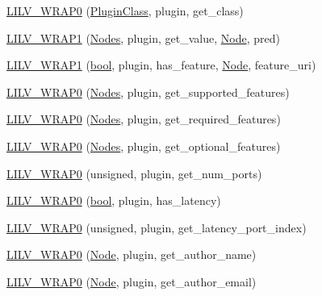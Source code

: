 \begin{DoxyCompactItemize}
\item 
\hyperlink{struct_lilv_1_1_plugin_ae3ee60fa48d7963b533a6f46e496bb43}{L\+I\+L\+V\+\_\+\+W\+R\+A\+P0} (\hyperlink{struct_lilv_1_1_plugin_class}{Plugin\+Class}, plugin, get\+\_\+class)
\item 
\hyperlink{struct_lilv_1_1_plugin_ab8fd226c1f03d79166c446ea66e290ea}{L\+I\+L\+V\+\_\+\+W\+R\+A\+P1} (\hyperlink{struct_lilv_1_1_nodes}{Nodes}, plugin, get\+\_\+value, \hyperlink{struct_lilv_1_1_node}{Node}, pred)
\item 
\hyperlink{struct_lilv_1_1_plugin_ac523ee93bb40a298d31e3a6c32ff5938}{L\+I\+L\+V\+\_\+\+W\+R\+A\+P1} (\hyperlink{mac_2config_2i386_2lib-src_2libsoxr_2soxr-config_8h_abb452686968e48b67397da5f97445f5b}{bool}, plugin, has\+\_\+feature, \hyperlink{struct_lilv_1_1_node}{Node}, feature\+\_\+uri)
\item 
\hyperlink{struct_lilv_1_1_plugin_ad7dc654acec47c0f0a0a3fa629aa5b95}{L\+I\+L\+V\+\_\+\+W\+R\+A\+P0} (\hyperlink{struct_lilv_1_1_nodes}{Nodes}, plugin, get\+\_\+supported\+\_\+features)
\item 
\hyperlink{struct_lilv_1_1_plugin_aec27a7035ca45e44f13acd545294dade}{L\+I\+L\+V\+\_\+\+W\+R\+A\+P0} (\hyperlink{struct_lilv_1_1_nodes}{Nodes}, plugin, get\+\_\+required\+\_\+features)
\item 
\hyperlink{struct_lilv_1_1_plugin_aacd337bfa602bf0c916d195c42d2288b}{L\+I\+L\+V\+\_\+\+W\+R\+A\+P0} (\hyperlink{struct_lilv_1_1_nodes}{Nodes}, plugin, get\+\_\+optional\+\_\+features)
\item 
\hyperlink{struct_lilv_1_1_plugin_ac046718a58544cf1d6975c31c3a842e8}{L\+I\+L\+V\+\_\+\+W\+R\+A\+P0} (unsigned, plugin, get\+\_\+num\+\_\+ports)
\item 
\hyperlink{struct_lilv_1_1_plugin_a737273ce0cd33e7de562db7be6bf428f}{L\+I\+L\+V\+\_\+\+W\+R\+A\+P0} (\hyperlink{mac_2config_2i386_2lib-src_2libsoxr_2soxr-config_8h_abb452686968e48b67397da5f97445f5b}{bool}, plugin, has\+\_\+latency)
\item 
\hyperlink{struct_lilv_1_1_plugin_a6955dc64317723c3e6ca23b21b2a8283}{L\+I\+L\+V\+\_\+\+W\+R\+A\+P0} (unsigned, plugin, get\+\_\+latency\+\_\+port\+\_\+index)
\item 
\hyperlink{struct_lilv_1_1_plugin_a9dc5933c0ee1308d189f633de4b1302c}{L\+I\+L\+V\+\_\+\+W\+R\+A\+P0} (\hyperlink{struct_lilv_1_1_node}{Node}, plugin, get\+\_\+author\+\_\+name)
\item 
\hyperlink{struct_lilv_1_1_plugin_a4accc2e0247737c684ba2b04cb29e6c7}{L\+I\+L\+V\+\_\+\+W\+R\+A\+P0} (\hyperlink{struct_lilv_1_1_node}{Node}, plugin, get\+\_\+author\+\_\+email)

\end{DoxyCompactItemize}
